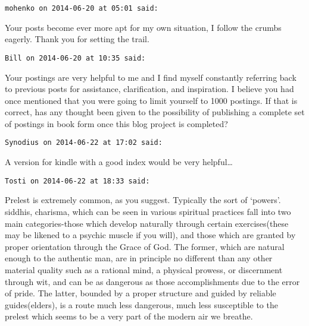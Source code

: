 \begin{footnotesize}\begin{sffamily}



\texttt{mohenko on 2014-06-20 at 05:01 said: }

Your posts become ever more apt for my own situation, I follow the crumbs eagerly. Thank you for setting the trail.


\hfill

\texttt{Bill on 2014-06-20 at 10:35 said: }

Your postings are very helpful to me and I find myself constantly referring back to previous posts for assistance, clarification, and inspiration. I believe you had once mentioned that you were going to limit yourself to 1000 postings. If that is correct, has any thought been given to the possibility of publishing a complete set of postings in book form once this blog project is completed?


\hfill

\texttt{Synodius on 2014-06-22 at 17:02 said: }

A version for kindle with a good index would be very helpful…


\hfill

\texttt{Tosti on 2014-06-22 at 18:33 said: }

Prelest is extremely common, as you suggest. Typically the sort of `powers'. siddhis, charisma, which can be seen in various spiritual practices fall into two main categories-those which develop naturally through certain exercises(these may be likened to a psychic muscle if you will), and those which are granted by proper orientation through the Grace of God. The former, which are natural enough to the authentic man, are in principle no different than any other material quality such as a rational mind, a physical prowess, or discernment through wit, and can be as dangerous as those accomplishments due to the error of pride. The latter, bounded by a proper structure and guided by reliable guides(elders), is a route much less dangerous, much less susceptible to the prelest which seems to be a very part of the modern air we breathe.


\end{sffamily}\end{footnotesize}
